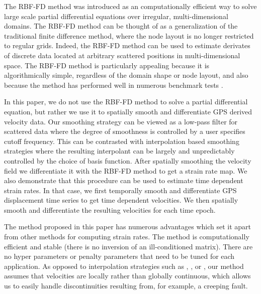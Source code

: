 \documentclass[10pt,a4paper]{article}
\begin{document}
The RBF-FD method was introduced as an computationally efficient way to solve large scale partial differential equations over irregular, multi-dimensional domains.  The RBF-FD method can be thought of as a generalization of the traditional finite difference method, where the node layout is no longer restricted to regular grids. Indeed, the RBF-FD method can be used to estimate derivates of discrete data located at arbitrary scattered positions in multi-dimensional space.  The RBF-FD method is particularly appealing because it is algorithmically simple, regardless of the domain shape or node layout, and also because the method has performed well in numerous benchmark tests \citep[and references therein]{Fornberg2015}.

In this paper, we do not use the RBF-FD method to solve a partial differential equation, but rather we use it to spatially smooth and differentiate GPS derived velocity data.  Our smoothing strategy can be viewed  as a low-pass filter for scattered data where the degree of smoothness is controlled by a user specifies cutoff frequency.  This can be contrasted with interpolation based smoothing strategies \citep[e.g.][]{Howell2016} where the resulting interpolant can be largely and unpredictably controlled by the choice of basis function.  After spatially smoothing the velocity field we differentiate it with the RBF-FD method to get a strain rate map.  We also demonstrate that this procedure can be used to estimate time dependent strain rates.  In that case, we first temporally smooth and differentiate GPS displacement time series to get time dependent velocities.  We then spatially smooth and differentiate the resulting velocities for each time epoch.  

The method proposed in this paper has numerous advantages which set it apart from other methods for computing strain rates. The method is computationally efficient and stable (there is no inversion of an ill-conditioned matrix).  There are no hyper parameters or penalty parameters that need to be tuned for each application.  As opposed to interpolation strategies such as \citet{Beavan2001}, \citet{Tape2009}, or \citet{Ohtani2010}, our method assumes that velocities are locally rather than globally continuous, which allows us to easily handle discontinuities resulting from, for example, a creeping fault. 
\end{document}
